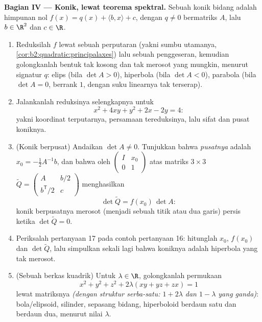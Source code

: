\begin{problem}
\medskip
\noindent\textbf{Bagian IV --- Konik, lewat teorema spektral.}
Sebuah konik bidang adalah himpunan nol $f(x) = q(x) + \langle b,
x\rangle + c$, dengan $q \neq 0$  bermatriks $A$,
lalu $b \in \R^2$ dan $c \in \R$.
\begin{enumerate}[resume]
  \item Reduksilah $f$ lewat sebuah perputaran (yakni sumbu utamanya,
        \cref{cor:b2:quadratic:principalaxes}) lalu sebuah
        penggeseran, kemudian golongkanlah bentuk tak kosong dan
        tak merosot yang mungkin, menurut signatur $q$: elips
        (bila $\det A > 0$), hiperbola (bila $\det A < 0$), parabola
        (bila $\det A = 0$, berrank $1$, dengan suku linearnya tak
        terserap).
  \item Jalankanlah reduksinya selengkapnya untuk
        \[
        x^2 + 4xy + y^2 + 2x - 2y = 4 :
        \]
        yakni koordinat terputarnya, persamaan tereduksinya, lalu sifat dan
        pusat koniknya.
  \item (Konik berpusat) Andaikan $\det A \neq 0$. Tunjukkan bahwa
        \emph{pusatnya} adalah $x_0 = -\frac12 A^{-1}b$, dan bahwa
         oleh $\begin{pmatrix} I & x_0\\ 0 &
        1\end{pmatrix}$ atas matriks $3\times3$ $\widetilde Q
        = \begin{pmatrix} A & b/2 \\ b^{\mathsf T}/2 &
        c\end{pmatrix}$ menghasilkan
        \[
        \det\widetilde Q = f(x_0)\,\det A :
        \]
        konik berpusatnya merosot (menjadi sebuah titik atau dua garis)
        persis ketika $\det\widetilde Q = 0$.
  \item Periksalah pertanyaan 17 pada contoh pertanyaan 16:
        hitunglah $x_0$, $f(x_0)$ dan $\det\widetilde Q$, lalu
        simpulkan sekali lagi bahwa koniknya adalah
        hiperbola yang tak merosot.
  \item (Sebuah berkas kuadrik) Untuk $\lambda \in \R$, golongkanlah
        permukaan
        \[
        x^2 + y^2 + z^2 + 2\lambda(xy + yz + zx) = 1
        \]
        lewat  matriksnya \emph{(dengan struktur
        serba-satu:  $1 + 2\lambda$ dan $1 -
        \lambda$ yang ganda)}: bola/elipsoid, silinder, sepasang
        bidang, hiperboloid berdaun satu dan berdaun dua, menurut
        nilai $\lambda$.
\end{enumerate}


\end{problem}
